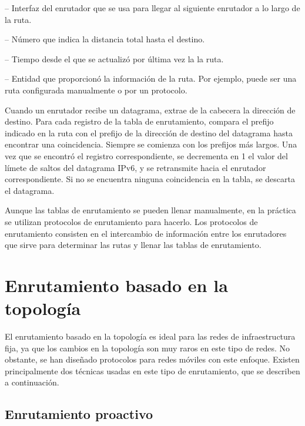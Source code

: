  -- Interfaz del enrutador que se usa para
llegar al siguiente enrutador a lo largo de la ruta.

 -- Número que indica la distancia total hasta el destino.

 -- Tiempo desde el que se actualizó por última vez la
la ruta.

 -- Entidad que proporcionó la
información de la ruta. Por ejemplo, puede ser una ruta configurada manualmente
o por un protocolo.

Cuando un enrutador recibe un datagrama, extrae de la cabecera la dirección de
destino. Para cada registro de la tabla de enrutamiento, compara el prefijo
indicado en la ruta con el prefijo de la dirección de destino del datagrama
hasta encontrar una coincidencia. Siempre se comienza con los prefijos más
largos. Una vez que se encontró el registro correspondiente, se decrementa en 1
el valor del límete de saltos del datagrama IPv6, y se retransmite hacia el
enrutador correspondiente. Si no se encuentra ninguna coincidencia en la tabla,
se descarta el datagrama.

Aunque las tablas de enrutamiento se pueden llenar manualmente, en la práctica
se utilizan protocolos de enrutamiento para hacerlo. Los protocolos de
enrutamiento consisten en el intercambio de información entre los enrutadores
que sirve para determinar las rutas y llenar las tablas de enrutamiento.

\section{Enrutamiento basado en la topología}

\label{sec:enrutamiento_basado_en_la_topologia}

El enrutamiento basado en la topología es ideal para las redes de
infraestructura fija, ya que los cambios en la topología son muy raros en este
tipo de redes. No obstante, se han diseñado protocolos para redes móviles con
este enfoque. Existen principalmente dos técnicas usadas en este tipo de
enrutamiento, que se describen a continuación.

\subsection{Enrutamiento proactivo}

